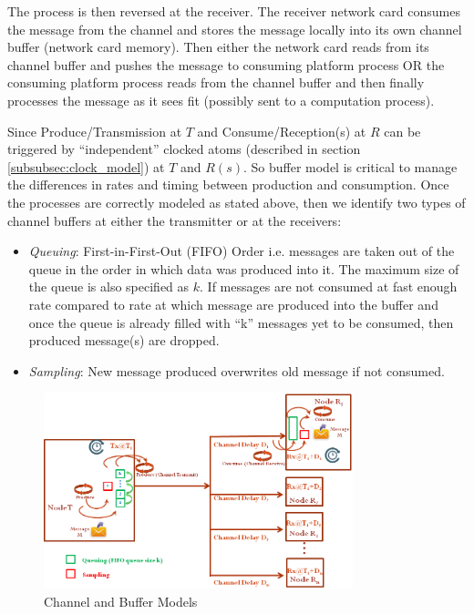 The process is then reversed at the receiver. The receiver network card consumes the message from the channel and stores the message locally into its own channel buffer (network card memory). Then either the network card reads from its channel buffer and pushes the message to consuming platform process OR the consuming platform process reads from the channel buffer and then finally processes the message as it sees fit (possibly sent to a computation process).

Since Produce/Transmission at $T$ and Consume/Reception(s) at $R$ can be triggered by ``independent'' clocked atoms (described in section \ref{subsubsec:clock_model}) at $T$ and $R(s)$. So buffer model is critical to manage the differences in rates and timing between production and consumption. Once the processes are correctly modeled as stated above, then we identify two types of channel buffers at either the transmitter or at the receivers:
\begin{itemize}
\item \emph{Queuing}: First-in-First-Out (FIFO) Order i.e. messages are taken out of the queue in the order in which data was produced into it.  The maximum size of the queue is also specified as $k$. If messages are not consumed at fast enough rate compared to rate at which message are produced into the buffer and once the queue is already filled with ``k'' messages yet to be consumed, then produced message(s) are dropped. 

\item \emph{Sampling}: New message produced overwrites old message if not consumed.

\end{itemize}


\begin{figure}
\begin{center}
\includegraphics[width=0.8\textwidth]{figures/channel_buffer.png}
\caption{Channel and Buffer Models}
\label{fig:channel_buffer}
\end{center}
\end{figure}


